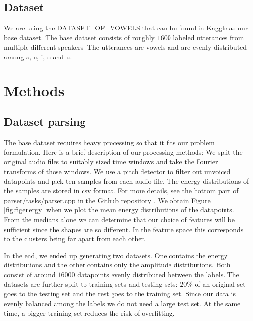 \documentclass[letterpaper,12pt]{article}
\begin{document}
\subsection{Dataset}

We are using the DATASET\_OF\_VOWELS that can be found in Kaggle\cite{dataset} as our base dataset. The base dataset consists of roughly $1600$ labeled utterances from multiple different speakers. The utterances are vowels and are evenly distributed among a, e, i, o and u.

\section{Methods}\label{sec:methods}

\subsection{Dataset parsing}

The base dataset requires heavy processing so that it fits our problem formulation. Here is a brief description of our processing methods: We split the original audio files to suitably sized time windows and take the Fourier transforms of those windows. We use a pitch detector to filter out unvoiced datapoints and pick ten samples from each audio file. The energy distributions of the samples are stored in csv format. For more details, see the bottom part of parser/tasks/parser.cpp in the Github repository \cite{repo}. We obtain Figure \ref{fig:figenergy} when we plot the mean energy distributions of the datapoints. From the medians alone we can determine that our choice of features will be sufficient since the shapes are so different. In the feature space this corresponds to the clusters being far apart from each other.

In the end, we ended up generating two datasets. One contains the energy distributions and the other contains only the amplitude distributions. Both consist of around $16000$ datapoints evenly distributed between the labels. The datasets are further split to training sets and testing sets: $20\%$ of an original set goes to the testing set and the rest goes to the training set. Since our data is evenly balanced among the labels we do not need a large test set. At the same time, a bigger training set reduces the risk of overfitting.
\end{document}
